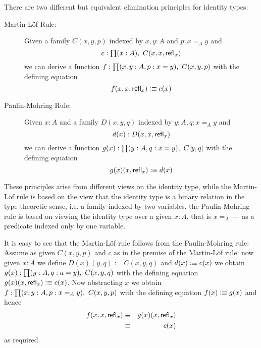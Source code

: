 There are two different but equivalent elimination principles for
identity types:
\begin{description}
\item[Martin-L\"{o}f Rule:] 
Given a family $C(x,y,p)$ indexed by $x,y:A$ and $p:x=_A y$ and 
\[c:\prd{x:A} C(x,x,\refl{x})\]
we can derive a function $f:\prd{x,y:A,p:x = y}C(x,y,p)$ with the
defining equation 
\[ f(x,x,\mathsf{refl}_{x}) \vcentcolon\equiv c(x) \]
\item[Paulin-Mohring Rule:] 
Given $x:A$ and a family $D(x,y,q)$ indexed by $y:A,q:x=_A y$ and 
\[ d(x):D(x,x,\mathsf{refl}_{x}) \]
we can derive a function $g(x):\prd{y:A,q:x = y}C[y,q]$ with the defining
equation 
\[ g(x)(x,\mathsf{refl}_{x}) \vcentcolon\equiv d(x) \]
\end{description}
These principles arise from different views on the identity type,
while the Martin-L\"of rule is based on the view that the identity
type is a binary relation in the type-theoretic sense, i.e. a family
indexed by two variables, the Paulin-Mohring rule is based on viewing
the identity type over a given $x:A$, that is $x =_A -$ as a predicate
indexed only by one variable.

It is easy to see that the Martin-L\"of rule follows from the
Paulin-Mohring rule: Assume as given $C(x,y,p)$ and $c$ as in the
premise of the Martin-L\"of rule: now given $x:A$ we define $D(x)(y,q) :=
C(x,y,q)$ and $d(x) \vcentcolon\equiv c(x)$ we obtain $g(x):\prd{y:A,q:a = y}C(x,y,q)$
with the defining equation $g(x)(x,\mathsf{refl}_{x}) \vcentcolon\equiv c(x)$. Now
abstracting $x$ we obtain $f : \prd{x,y:A,p:x =_A y}C(x,y,p)$ with the
defining equation $f(x) \vcentcolon\equiv g(x)$ and hence 
\begin{eqnarray*}
f(x,x,\mathsf{refl}_{x}) & \equiv & g(x)(x,\mathsf{refl}_{x})  \\
                   & \equiv & c(x)
\end{eqnarray*}
as required.

